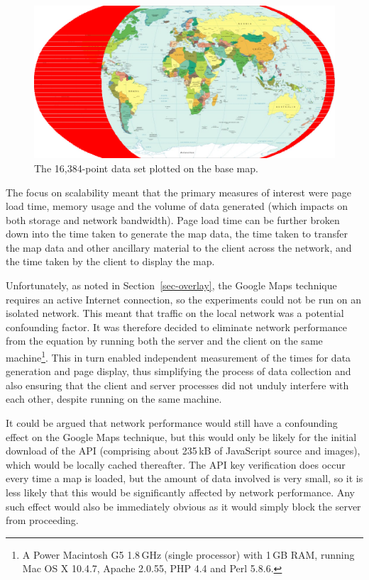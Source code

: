 \documentclass[acmnow]{acmtrans2m}
\begin{document}
\begin{figure}
	\centering
	\includegraphics[width=\textwidth,keepaspectratio]{16384_points}
	\caption{The 16,384-point data set plotted on the base map.}
	\label{fig-grid-points}
\end{figure}


The focus on scalability meant that the primary measures of interest
were page load time, memory usage and the volume of data generated
(which impacts on both storage and network bandwidth). Page load time
can be further broken down into the time taken to generate the map data,
the time taken to transfer the map data and other ancillary material to
the client across the network, and the time taken by the client to
display the map.

Unfortunately, as noted in Section~\ref{sec-overlay}, the Google Maps
technique requires an active Internet connection, so the experiments
could not be run on an isolated network. This meant that traffic on the
local network was a potential confounding factor. It was therefore
decided to eliminate network performance from the equation by running
both the server and the client on the same machine\footnote{A Power
Macintosh G5 1.8\,GHz (single processor) with 1\,GB RAM, running Mac OS
X 10.4.7, Apache 2.0.55, PHP 4.4 and Perl 5.8.6.}. This in turn enabled
independent measurement of the times for data generation and page
display, thus simplifying the process of data collection and also
ensuring that the client and server processes did not unduly interfere
with each other, despite running on the same machine.

It could be argued that network performance would still have a
confounding effect on the Google Maps technique, but this would only be
likely for the initial download of the API (comprising about 235\,kB of
JavaScript source and images), which would be locally cached thereafter.
The API key verification does occur every time a map is loaded, but
the amount of data involved is very small, so it is less likely that
this would be significantly affected by network performance. Any such
effect would also be immediately obvious as it would simply block the
server from proceeding.
\end{document}
